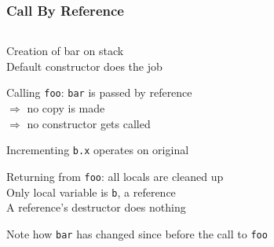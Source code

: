 \begin{frame}
  \frametitle{Call By Reference}
  \begin{center}
    \begin{columns}
      \column{6cm}
      \column{6cm}
    \end{columns}
  \end{center}
  \vskip2mm
  \begin{overprint}
    \begin{center}
      Creation of bar on stack \\
      Default constructor does the job
    \end{center}

    \begin{center}
      Calling {\tt foo}: {\tt bar} is passed by reference \\
      $\Rightarrow$ no copy is made \\
      $\Rightarrow$ no constructor gets called
    \end{center}

    \begin{center}
      Incrementing {\tt b.x} operates on original
    \end{center}

    \begin{center}
      Returning from {\tt foo}: all locals are cleaned up \\
      Only local variable is {\tt b}, a reference \\
      A reference's destructor does nothing
    \end{center}

    \begin{center}
      Note how {\tt bar} has changed since before the call to {\tt foo}
    \end{center}
  \end{overprint}
\end{frame}




